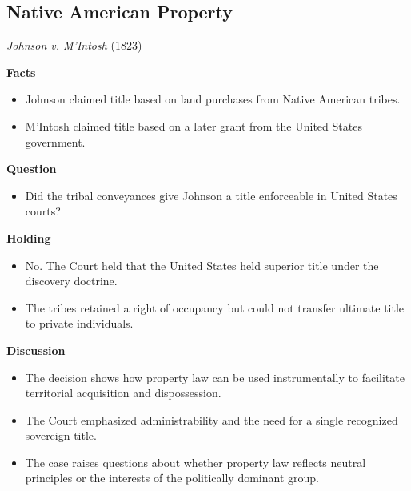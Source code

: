 \documentclass[11pt]{tex/lawoutline}
\begin{document}
\subsection{Native American Property}

\casebox
{\textit{Johnson v. M'Intosh} (1823)}
{}
{
\textbf{Facts}
\begin{itemize}
    \item Johnson claimed title based on land purchases from Native American tribes.
    \item M'Intosh claimed title based on a later grant from the United States government.
\end{itemize}

\textbf{Question}
\begin{itemize}
    \item Did the tribal conveyances give Johnson a title enforceable in United States courts?
\end{itemize}

\textbf{Holding}
\begin{itemize}
    \item No. The Court held that the United States held superior title under the discovery doctrine.
    \item The tribes retained a right of occupancy but could not transfer ultimate title to private individuals.
\end{itemize}

\textbf{Discussion}
\begin{itemize}
    \item The decision shows how property law can be used instrumentally to facilitate territorial acquisition and dispossession.
    \item The Court emphasized administrability and the need for a single recognized sovereign title.
    \item The case raises questions about whether property law reflects neutral principles or the interests of the politically dominant group.
\end{itemize}
}

\end{document}
